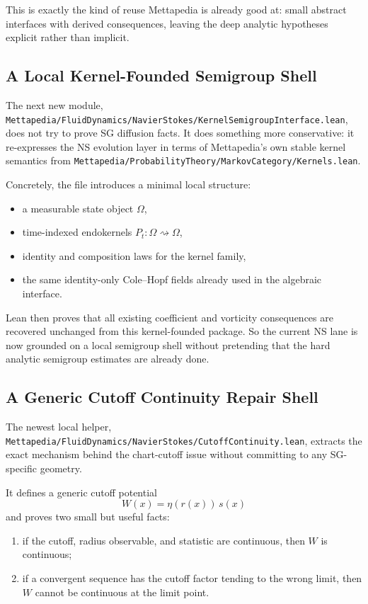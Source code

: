 \documentclass[11pt]{article}
\theoremstyle{remark}
\begin{document}
This is exactly the kind of reuse Mettapedia is already good at: small abstract
interfaces with derived consequences, leaving the deep analytic hypotheses
explicit rather than implicit.

\subsection{A Local Kernel-Founded Semigroup Shell}

The next new module,
\texttt{Mettapedia/FluidDynamics/NavierStokes/KernelSemigroupInterface.lean},
does not try to prove SG diffusion facts.  It does something more conservative:
it re-expresses the NS evolution layer in terms of Mettapedia's own stable
kernel semantics from
\texttt{Mettapedia/ProbabilityTheory/MarkovCategory/Kernels.lean}.

Concretely, the file introduces a minimal local structure:
\begin{itemize}[leftmargin=1.5em]
  \item a measurable state object \(\Omega\),
  \item time-indexed endokernels \(P_t : \Omega \rightsquigarrow \Omega\),
  \item identity and composition laws for the kernel family,
  \item the same identity-only Cole--Hopf fields already used in the algebraic
  interface.
\end{itemize}

Lean then proves that all existing coefficient and vorticity consequences are
recovered unchanged from this kernel-founded package.  So the current NS lane
is now grounded on a local semigroup shell without pretending that the hard
analytic semigroup estimates are already done.

\subsection{A Generic Cutoff Continuity Repair Shell}

The newest local helper,
\texttt{Mettapedia/FluidDynamics/NavierStokes/CutoffContinuity.lean},
extracts the exact mechanism behind the chart-cutoff issue without committing
to any SG-specific geometry.

It defines a generic cutoff potential
\[
  W(x) = \eta(r(x))\,s(x)
\]
and proves two small but useful facts:
\begin{enumerate}[leftmargin=1.5em]
  \item if the cutoff, radius observable, and statistic are continuous, then
  \(W\) is continuous;
  \item if a convergent sequence has the cutoff factor tending to the wrong
  limit, then \(W\) cannot be continuous at the limit point.
\end{enumerate}
\end{document}
